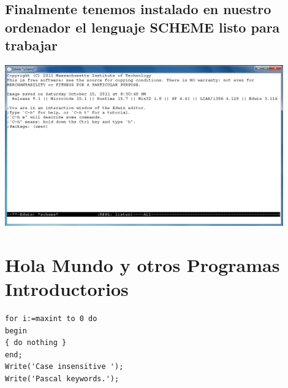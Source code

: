 \documentclass[11pt]{article} %
\begin{document}
\subsection{Finalmente tenemos instalado en nuestro ordenador el lenguaje SCHEME listo para trabajar}
\begin{center}
\includegraphics[width=12cm]{8.png}
\end{center}

\section{Hola Mundo y otros Programas Introductorios}

\lstset{language=Pascal}          %

\begin{lstlisting}[frame=single]  % Start your code-block
for i:=maxint to 0 do
begin
{ do nothing }
end;
Write('Case insensitive ');
Write('Pascal keywords.');
\end{lstlisting}
\end{document}
